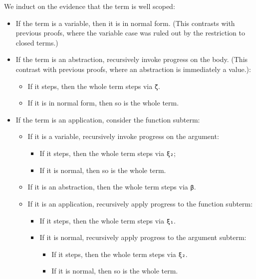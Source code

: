 We induct on the evidence that the term is well scoped:

\begin{itemize}
\tightlist
\item
  If the term is a variable, then it is in normal form. (This contrasts
  with previous proofs, where the variable case was ruled out by the
  restriction to closed terms.)
\item
  If the term is an abstraction, recursively invoke progress on the
  body. (This contrast with previous proofs, where an abstraction is
  immediately a value.):

  \begin{itemize}
  \tightlist
  \item
    If it steps, then the whole term steps via \texttt{ζ}.
  \item
    If it is in normal form, then so is the whole term.
  \end{itemize}
\item
  If the term is an application, consider the function subterm:

  \begin{itemize}
  \tightlist
  \item
    If it is a variable, recursively invoke progress on the argument:

    \begin{itemize}
    \tightlist
    \item
      If it steps, then the whole term steps via \texttt{ξ₂};
    \item
      If it is normal, then so is the whole term.
    \end{itemize}
  \item
    If it is an abstraction, then the whole term steps via \texttt{β}.
  \item
    If it is an application, recursively apply progress to the function
    subterm:

    \begin{itemize}
    \tightlist
    \item
      If it steps, then the whole term steps via \texttt{ξ₁}.
    \item
      If it is normal, recursively apply progress to the argument
      subterm:

      \begin{itemize}
      \tightlist
      \item
        If it steps, then the whole term steps via \texttt{ξ₂}.
      \item
        If it is normal, then so is the whole term.
      \end{itemize}
    \end{itemize}
  \end{itemize}
\end{itemize}

